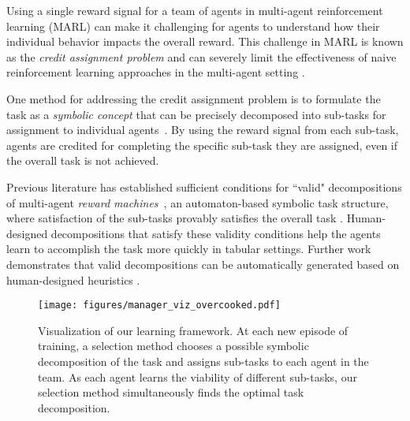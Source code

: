 

Using a single reward signal for a team of agents in multi-agent reinforcement learning (MARL) can make it challenging for agents to understand how their individual behavior impacts the overall reward. This challenge in MARL is known as the \textit{credit assignment problem} \cite{agogino2004creditassignment} and can severely limit the effectiveness of naive reinforcement learning approaches in the multi-agent setting \cite{Oroojlooy2023cmarlsurvey, sunehag2017value}. 


One method for addressing the credit assignment problem is to formulate the task as a \textit{symbolic concept} that can be precisely decomposed into sub-tasks for assignment to individual agents~\cite{neary2020reward, smith2023automatic}. By using the reward signal from each sub-task, agents are credited for completing the specific sub-task they are assigned, even if the overall task is not achieved. %

Previous literature has established sufficient conditions for ``valid" decompositions of multi-agent \textit{reward machines}~\cite{Icarte2020RewardMachine}, an automaton-based symbolic task structure, where satisfaction of the sub-tasks provably satisfies the overall task \cite{neary2020reward}. Human-designed decompositions that satisfy these validity conditions help the agents learn to accomplish the task more quickly in tabular settings. Further work demonstrates that valid decompositions can be automatically generated based on human-designed heuristics \cite{smith2023automatic}.


\begin{figure}[t]
\centering
\texttt{[image: figures/manager\_viz\_overcooked.pdf]}
\caption{Visualization of our learning framework. At each new episode of training, a selection method chooses a possible symbolic decomposition of the task and assigns sub-tasks to each agent in the team. As each agent learns the viability of different sub-tasks, our selection method simultaneously finds the optimal task decomposition.}
\label{fig:overview}
\end{figure} 


